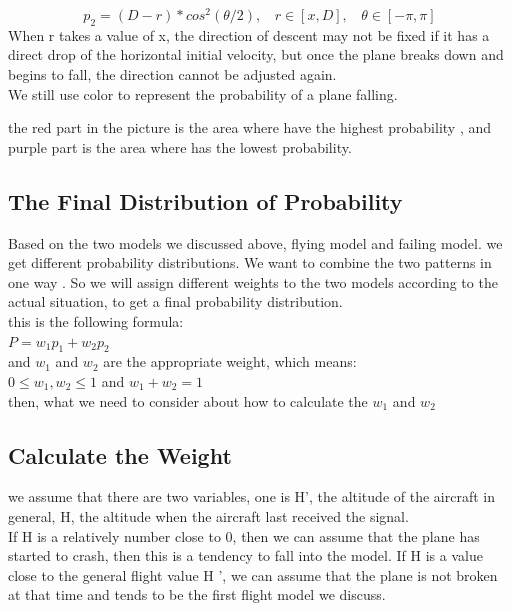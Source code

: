 \documentclass[11pt]{article}
\begin{document}
\[p_2=(D-r)*cos^2(\theta/2), ~ ~ ~ ~ r\in[x,D], ~ ~ ~ ~ \theta\in[-\pi,\pi]\]
When r takes a value of x, the direction of descent may not be fixed if it has a direct drop of the horizontal initial velocity, but once the plane breaks down and begins to fall, the direction cannot be adjusted again. \\We still use color to represent the probability of a plane falling.\\
\begin{center}
    \end{center}
the red part in the picture is the area where have the highest probability , and purple part is the area where has the lowest probability. \\
\hypertarget{the final distribution of probability}{%
\subsection{The Final Distribution of Probability}\label{The Final Distribution of Probability}}
Based on the two models we discussed above, flying model and failing model.  we get different probability distributions. We want to combine the two patterns in one way . So we will assign different weights to the two models according to the actual situation, to get a final probability distribution.\\
this is the following formula:\\
{$P=w_1p_1+w_2p_2$}\\
and $w_1$ and $w_2$ are the appropriate weight, which means:\\
{$0 \leq w_1, w_2 \leq 1$ and $w_1+w_2=1$}\\
then, what we need to consider about how to calculate the $w_1$ and $w_2$\\
\hypertarget{Calculate the Weight}{%
\subsection{Calculate the Weight}\label{Calculate the Weight}}
we assume that there are two variables, one is H', the altitude of the aircraft in general, H, the altitude when the aircraft last received the signal.\\
If H is a relatively number close to 0, then we can assume that the plane has started to crash, then this is a tendency to fall into the model. If H is a value close to the general flight value H ', we can assume that the plane is not broken at that time and tends to be the first flight model we discuss.\\
\end{document}
